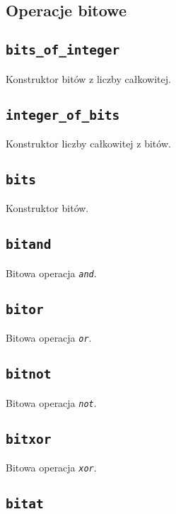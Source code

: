 \subsection{Operacje bitowe}
\label{viua_vm_ops_bit_ops}

\subsection{\texttt{bits\_of\_integer}}

Konstruktor bitów z liczby całkowitej.

\subsection{\texttt{integer\_of\_bits}}

Konstruktor liczby całkowitej z bitów.

\subsection{\texttt{bits}}

Konstruktor bitów.

\subsection{\texttt{bitand}}

Bitowa operacja \emph{\texttt{and}}.

\subsection{\texttt{bitor}}

Bitowa operacja \emph{\texttt{or}}.

\subsection{\texttt{bitnot}}

Bitowa operacja \emph{\texttt{not}}.

\subsection{\texttt{bitxor}}

Bitowa operacja \emph{\texttt{xor}}.

\subsection{\texttt{bitat}}


